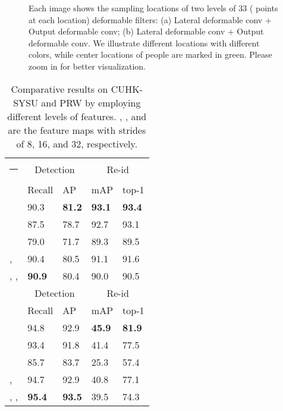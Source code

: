 \documentclass[journal]{IEEEtran}
\makeatletter
\newcommand{\thickhline}{\noalign {\ifnum 0=`}\fi \hrule height 1pt
    \futurelet \reserved@a \@xhline
}
\makeatother
\begin{document}
\begin{figure*}[t]
\begin{center}
 \hfill
{}
\end{center}
\caption{Each image shows the sampling locations of two levels of 33 ( points at each location) deformable filters: (a) Lateral deformable conv  + Output deformable conv; (b) Lateral deformable conv  + Output deformable conv. We illustrate different locations with different colors, while center locations of people are marked in green. Please zoom in for better visualization.}
\label{fig:dcnvis}
\end{figure*}


\begin{table}[ht]
\small
\centering
\begin{tabular}{p{2cm}|p{1.1cm}<{\centering}p{1.1cm}<{\centering}|p{1.1cm}<{\centering}p{1.1cm}<{\centering}}
\hline\thickhline
\rowcolor{mygray} 
  & \multicolumn{2}{c|}{Detection} & \multicolumn{2}{c}{Re-id}   \\ \cline{2-5} 
\rowcolor{mygray} 
\multirow{-2}{*}{CUKH-SYSU}  & Recall & AP  & mAP  & top-1  \\  \hline \hline     

  & 90.3    & \textbf{81.2} &\textbf{93.1} & \textbf{93.4}  \\
  & 87.5   & 78.7       & 92.7   & 93.1    \\ 
  & 79.0   & 71.7       & 89.3   & 89.5  \\
,   & 90.4  & 80.5       & 91.1 & 91.6 \\ 
, ,   & \textbf{90.9}  & 80.4       & 90.0 & 90.5 \\\hline \hline
\rowcolor{mygray} 
  & \multicolumn{2}{c|}{Detection} & \multicolumn{2}{c}{Re-id}   \\ \cline{2-5} 
\rowcolor{mygray} 
\multirow{-2}{*}{PRW}  & Recall & AP  & mAP  & top-1  \\  \hline \hline     

  &  94.8   & 92.9  &\textbf{45.9} & \textbf{81.9}  \\
  &   93.4  &  91.8      & 41.4   & 77.5    \\ 
  &  85.7  &    83.7    & 25.3  & 57.4  \\
,   & 94.7 & 92.9      & 40.8 & 77.1 \\ 
, ,   &  \textbf{95.4}  &    \textbf{93.5}  & 39.5 & 74.3 \\\hline
\end{tabular}
\caption{Comparative results on CUHK-SYSU and PRW by employing different levels of features. , , and  are the feature maps with strides of 8, 16, and 32, respectively. }
\label{tab:scale}
\end{table}
\end{document}
